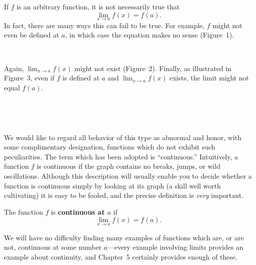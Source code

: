 

If $f$ is an arbitrary function, it is not necessarily true that
\[
\lim_{x \to a} f(x) = f(a).
\]
In fact, there are many ways this can fail to be true. For example, $f$
might not even be defined at $a$, in which case the equation makes no
sense (Figure~1).

\begin{center}
\\[0.6em]
\end{center}

Again, $\lim_{x \to a} f(x)$ might not exist (Figure~2). Finally, as
illustrated in Figure~3, even if $f$ is defined at $a$ and
$\lim_{x \to a} f(x)$ exists, the limit might not equal $f(a)$.

\begin{center}
\\[0.6em]
\end{center}

\begin{center}
\\[0.6em]
\end{center}

We would like to regard all behavior of this type as abnormal and honor,
with some complimentary designation, functions which do not exhibit such
peculiarities. The term which has been adopted is ``continuous.''
Intuitively, a function $f$ is continuous if the graph contains no
breaks, jumps, or wild oscillations. Although this description will
usually enable you to decide whether a function is continuous simply by
looking at its graph (a skill well worth cultivating) it is easy to be
fooled, and the precise definition is \emph{very} important.

\begin{spivakdefn}
The function $f$ is \textbf{continuous at $a$} if
\[
\lim_{x \to a} f(x) = f(a).
\]
\end{spivakdefn}

We will have no difficulty finding many examples of functions which are,
or are not, continuous at some number $a$---every example involving
limits provides an example about continuity, and Chapter~5 certainly
provides enough of these.

